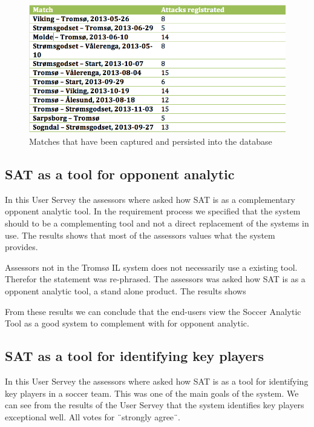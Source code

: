 \begin{figure}[ht!]
\centering
\includegraphics[width=1\textwidth]{images/general/matched_regged.png}
\caption{Matches that have been captured and persisted into the database}
\label{fig:matches_regged}
\end{figure}

\subsection{SAT as a tool for opponent analytic}

In this User Servey the assessors where asked how SAT is as a complementary opponent analytic tool. In the requirement process we specified that the system should to be a complementing tool and not a direct replacement of the systems in use. The results shows that most of the assessors values what the system provides. 

Assessors not in the Tromsø IL system does not necessarily use a existing tool. Therefor the statement was re-phrased. The assessors was asked how SAT is as a opponent analytic tool, a stand alone product. The results shows

From these results we can conclude that the end-users view the Soccer Analytic Tool as a good system to complement with for opponent analytic. 

\subsection{SAT as a tool for identifying key players}

In this User Servey the assessors where asked how SAT is as a tool for identifying key players in a soccer team. This was one of the main goals of the system. We can see from the results of the User Servey that the system identifies key players exceptional well. All votes for ¨strongly agree¨. 


